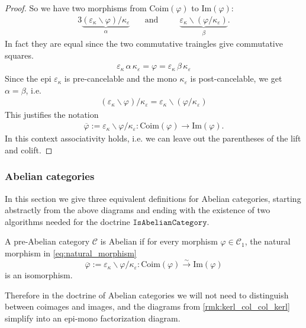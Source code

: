 \begin{proof}
So we have two morphisms from $\mathrm{Coim}(\varphi)$ to $\mathrm{Im}(\varphi)$:
\begin{alignat*}{3}
\underbrace{(\varepsilon_{\kappa}\backslash \varphi) / \kappa_{\varepsilon}}_{\alpha} & \quad\text{and}\quad
&& \underbrace{\varepsilon_{\kappa}\backslash(\varphi/\kappa_{\varepsilon})}_{\beta}.
\end{alignat*}
In fact they are equal since the two commutative traingles give commutative squares.
\begin{align*}
\varepsilon_{\kappa}\, \alpha \, \kappa_{\varepsilon} = \varphi = \varepsilon_{\kappa}\, \beta \, \kappa_{\varepsilon} 
\end{align*}
Since the epi $\varepsilon_{\kappa}$ is pre-cancelable and the mono $\kappa_{\varepsilon}$ is post-cancelable, we get $\alpha = \beta$, i.e.
\begin{align*}
(\varepsilon_{\kappa}\backslash \varphi) / \kappa_{\varepsilon} = \varepsilon_{\kappa}\backslash(\varphi/\kappa_{\varepsilon})
\end{align*}
This justifies the notation
\begin{align}\label{eq:natural_morphism}
\overline{\varphi} := \varepsilon_{\kappa}\backslash \varphi / \kappa_{\varepsilon} : \mathrm{Coim}(\varphi) \rightarrow \mathrm{Im}(\varphi).
\end{align}
In this context associativity holds, i.e. we can leave out the parentheses of the lift and colift.
\end{proof}

\subsubsection{Abelian categories}

In this section we give three equivalent definitions for Abelian categories, starting abstractly from the above diagrams
and ending with the existence of two algorithms needed for the doctrine $\mathtt{IsAbelianCategory}$.

\begin{definition}
A pre-Abelian category $\mathcal{C}$ is Abelian if for every morphism $\varphi \in \mathcal{C}_{1}$, the natural morphism
in \eqref{eq:natural_morphism}
\[
\overline{\varphi} := \varepsilon_{\kappa}\backslash \varphi/\kappa_{\varepsilon} : \mathrm{Coim}(\varphi)
\xrightarrow{\sim} \mathrm{Im}(\varphi)
\]
is an isomorphism.
\end{definition}
Therefore in the doctrine of Abelian categories we will not need to distinguish between coimages and images, and
the diagrams from \ref{rmk:kerl_col_col_kerl} simplify into an epi-mono factorization diagram.

